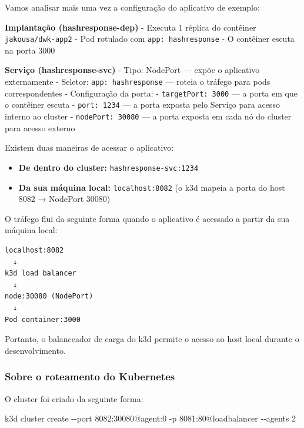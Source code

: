 \documentclass[
]{article}
\newenvironment{Shaded}{}{}
\newcommand{\AttributeTok}[1]{\textcolor[rgb]{0.49,0.56,0.16}{#1}}
\newcommand{\ExtensionTok}[1]{#1}
\newcommand{\NormalTok}[1]{#1}
\providecommand{\tightlist}{%
  \setlength{\itemsep}{0pt}\setlength{\parskip}{0pt}}
\begin{document}
Vamos analisar mais uma vez a configuração do aplicativo de exemplo:

\textbf{Implantação (hashresponse-dep)} - Executa 1 réplica do contêiner
\texttt{jakousa/dwk-app2} - Pod rotulado com \texttt{app:\ hashresponse}
- O contêiner escuta na porta 3000

\textbf{Serviço (hashresponse-svc)} - Tipo: NodePort --- expõe o
aplicativo externamente - Seletor: \texttt{app:\ hashresponse} ---
roteia o tráfego para pods correspondentes - Configuração da porta: -
\texttt{targetPort:\ 3000} --- a porta em que o contêiner escuta -
\texttt{port:\ 1234} --- a porta exposta pelo Serviço para acesso
interno ao cluster - \texttt{nodePort:\ 30080} --- a porta exposta em
cada nó do cluster para acesso externo

Existem duas maneiras de acessar o aplicativo:

\begin{itemize}
\tightlist
\item
  \textbf{De dentro do cluster:} \texttt{hashresponse-svc:1234}
\item
  \textbf{Da sua máquina local:} \texttt{localhost:8082} (o k3d mapeia a
  porta do host 8082 → NodePort 30080)
\end{itemize}

O tráfego flui da seguinte forma quando o aplicativo é acessado a partir
da sua máquina local:

\begin{verbatim}
localhost:8082
  ↓
k3d load balancer
  ↓
node:30080 (NodePort)
  ↓
Pod container:3000
\end{verbatim}

Portanto, o balanceador de carga do k3d permite o acesso ao host local
durante o desenvolvimento.

\subsubsection{Sobre o roteamento do
Kubernetes}\label{sobre-o-roteamento-do-kubernetes}

O cluster foi criado da seguinte forma:

\begin{Shaded}
\begin{Highlighting}[]
\ExtensionTok{k3d}\NormalTok{ cluster create }\AttributeTok{{-}{-}port}\NormalTok{ 8082:30080@agent:0 }\AttributeTok{{-}p}\NormalTok{ 8081:80@loadbalancer }\AttributeTok{{-}{-}agents}\NormalTok{ 2}
\end{Highlighting}
\end{Shaded}
\end{document}
